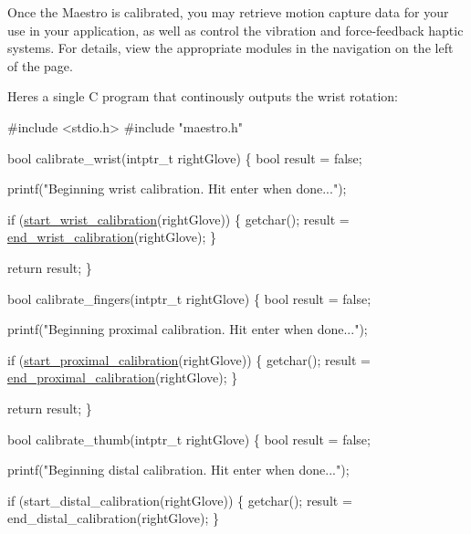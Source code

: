 Once the Maestro is calibrated, you may retrieve motion capture data for your use in your application, as well as control the vibration and force-\/feedback haptic systems. For details, view the appropriate modules in the navigation on the left of the page.

Here\textquotesingle{}s a single C program that continously outputs the wrist rotation\+:


\begin{DoxyCode}
\textcolor{preprocessor}{#include <stdio.h>}
\textcolor{preprocessor}{#include "maestro.h"}

\textcolor{keywordtype}{bool} calibrate\_wrist(intptr\_t rightGlove)
\{
    \textcolor{keywordtype}{bool} result = \textcolor{keyword}{false};

    printf(\textcolor{stringliteral}{"Beginning wrist calibration. Hit enter when done..."});

    \textcolor{keywordflow}{if} (\hyperlink{group__glove_calibration_ga7a6d895e59fe7a4f554b05ab067087cc}{start\_wrist\_calibration}(rightGlove)) \{
        getchar();
        result = \hyperlink{group__glove_calibration_ga4528575643eb59c92277338516679588}{end\_wrist\_calibration}(rightGlove);
    \}

    \textcolor{keywordflow}{return} result;
\}

\textcolor{keywordtype}{bool} calibrate\_fingers(intptr\_t rightGlove)
\{
    \textcolor{keywordtype}{bool} result = \textcolor{keyword}{false};

    printf(\textcolor{stringliteral}{"Beginning proximal calibration. Hit enter when done..."});

    \textcolor{keywordflow}{if} (\hyperlink{group__glove_calibration_ga8aa9f0c942b42299bc16440ce3d2c785}{start\_proximal\_calibration}(rightGlove)) \{
        getchar();
        result = \hyperlink{group__glove_calibration_gaca292cd71d6b63a803381ba9a43c3d85}{end\_proximal\_calibration}(rightGlove);
    \}

    \textcolor{keywordflow}{return} result;
\}

\textcolor{keywordtype}{bool} calibrate\_thumb(intptr\_t rightGlove)
\{
    \textcolor{keywordtype}{bool} result = \textcolor{keyword}{false};

    printf(\textcolor{stringliteral}{"Beginning distal calibration. Hit enter when done..."});

    \textcolor{keywordflow}{if} (start\_distal\_calibration(rightGlove)) \{
        getchar();
        result = end\_distal\_calibration(rightGlove);
    \}


\end{DoxyCode}
